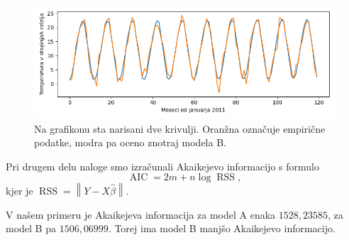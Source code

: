 \documentclass{article}
\DeclareMathOperator{\aic}{AIC}
\DeclareMathOperator{\rss}{RSS}
\begin{document}
\begin{figure}[H]
    \centering{}
    \includegraphics[scale=0.6]{3b.png}
    \caption{Na grafikonu sta narisani dve krivulji. Oranžna označuje empirične
    podatke, modra pa oceno znotraj modela B.}
    \label{slika 3b}
\end{figure}

Pri drugem delu naloge smo izračunali Akaikejevo informacijo s formulo
\begin{equation*}
    \aic = 2m + n \log \rss,
\end{equation*}
kjer je $\rss = \left\| Y - X \hat{\beta} \right\|$.

V našem primeru je Akaikejeva informacija za model A enaka $1528{,}23585$, za
model B pa $1506{,}06999$. Torej ima model B manjšo Akaikejevo informacijo.

% 
\end{document}
